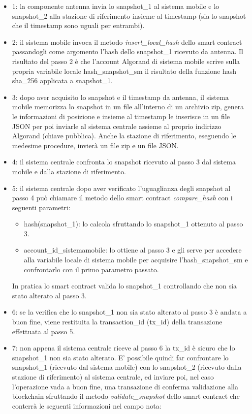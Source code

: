 \begin{itemize}
\item 1: la componente antenna invia lo snapshot\_1 al sistema mobile e lo snapshot\_2 alla stazione di riferimento insieme al timestamp (sia lo snapshot che il timestamp sono uguali per entrambi).
\item 2: il sistema mobile invoca il metodo \textit{insert\_local\_hash} dello smart contract passandogli come argomento l'hash dello snapshot\_1 ricevuto da antenna. Il risultato del passo 2 è che l'account Algorand di sistema mobile scrive sulla propria variabile locale hash\_snapshot\_sm il risultato della funzione hash sha\_256 applicata a snapshot\_1.
\item 3: dopo aver acquisito lo snapshot e il timestamp da antenna, il sistema mobile memorizza lo snapshot in un file all'interno di un archivio zip, genera le informazioni di posizione e insieme al timestamp le inserisce in un file JSON per poi inviarle al sistema centrale assieme al proprio indirizzo Algorand (chiave pubblica). Anche la stazione di riferimento, eseguendo le medesime procedure, invierà un file zip e un file JSON.
\item 4: il sistema centrale confronta lo snapshot ricevuto al passo 3 dal sistema mobile e dalla stazione di riferimento.
\item 5: il sistema centrale dopo aver verificato l'uguaglianza degli snapshot al passo 4 può chiamare il metodo dello smart contract \textit{compare\_hash} con i seguenti parametri:
\begin{itemize}
    \item hash(snapshot\_1): lo calcola sfruttando lo snapshot\_1 ottenuto al passo 3.
    \item account\_id\_sistemamobile: lo ottiene al passo 3 e gli serve per accedere alla variabile locale di sistema mobile per acquisire l’hash\_snapshot\_sm e confrontarlo con il primo parametro passato.
\end{itemize}
In pratica lo smart contract valida lo snapshot\_1 controllando che non sia stato alterato al passo 3.
\item 6: se la verifica che lo snapshot\_1 non sia stato alterato al passo 3 è andata a buon fine, viene restituita la transaction\_id (tx\_id) della transazione effettuata al passo 5.
\item 7: non appena il sistema centrale riceve al passo 6 la tx\_id è sicuro che lo snapshot\_1 non sia stato alterato. E' possibile quindi far confrontare lo snapshot\_1 (ricevuto dal sistema mobile) con lo snapshot\_2 (ricevuto dalla stazione di riferimento) al sistema centrale, ed inviare poi, nel caso l'operazione vada a buon fine, una transazione di conferma validazione alla blockchain sfruttando il metodo \textit{validate\_snapshot} dello smart contract che conterrà le seguenti informazioni nel campo nota:

\end{itemize}
